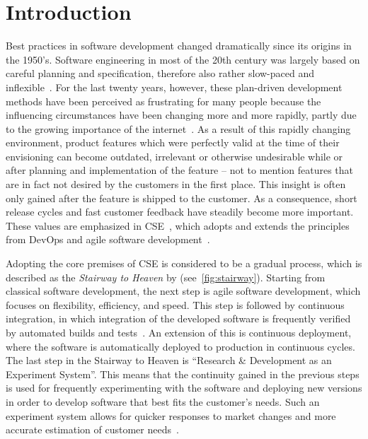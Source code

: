 %
\chapter{Introduction}
\label{ch:intro}





Best practices in software development changed dramatically since its origins in the 1950's.
Software engineering in most of the 20th century was largely based on careful planning and specification, therefore also rather slow-paced and inflexible~\cite{boehm2006view}.
For the last twenty years, however, these plan-driven development methods have been perceived as frustrating for many people because the influencing circumstances have been changing more and more rapidly, partly due to the growing importance of the internet~\cite{Williams2003}.
As a result of this rapidly changing environment, product features which were perfectly valid at the time of their envisioning can become outdated, irrelevant or otherwise undesirable while or after planning and implementation of the feature -- not to mention features that are in fact not desired by the customers in the first place.
This insight is often only gained after the feature is shipped to the customer.
As a consequence, short release cycles and fast customer feedback have steadily become more important.
These values are emphasized in \acf{CSE}~\cite{Bosch2014}, which adopts and extends the principles from DevOps and agile software development~\cite{Fitzgerald2017,fowler2001agile}.

Adopting the core premises of \ac{CSE} is considered to be a gradual process, which is described as the \emph{Stairway to Heaven} by \citet{Olsson2012} (see~\cref{fig:stairway}).
Starting from classical software development, the next step is agile software development, which focuses on flexibility, efficiency, and speed.
This step is followed by continuous integration, in which integration of the developed software is frequently verified by automated builds and tests~\cite[Maintaining Model Integrity, pp.~341~ff.]{evans2004domain}.
An extension of this is continuous deployment, where the software is automatically deployed to production in continuous cycles.
The last step in the Stairway to Heaven is ``Research \& Development as an Experiment System''.
This means that the continuity gained in the previous steps is used for frequently experimenting with the software and deploying new versions in order to develop software that best fits the customer's needs.
Such an experiment system allows for quicker responses to market changes and more accurate estimation of customer needs~\cite{Olsson2012}.

